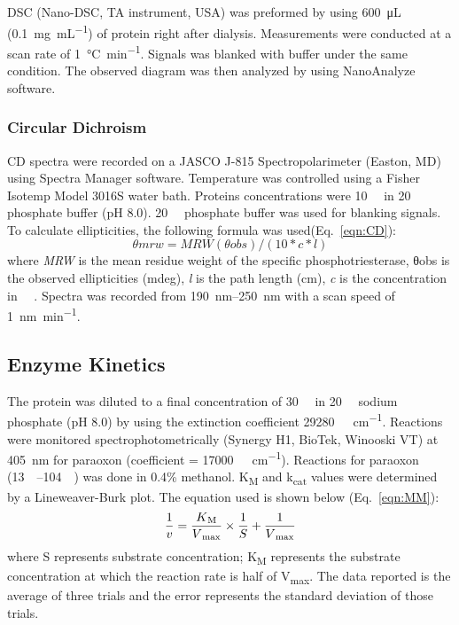\begin{refsection}
DSC (Nano-DSC, TA instrument, USA) was preformed by using \SI{600}{\micro\L}
(\SI{0.1}{\mg\per\mL}) of protein right after dialysis. Measurements were
conducted at a scan rate of \SI{1}{\celsius\per\minute}. Signals was blanked with
buffer under the same condition.  The observed diagram was then analyzed by
using NanoAnalyze software.

\subsubsection{Circular Dichroism}
\label{sec:cd}

CD spectra were recorded on a JASCO J-815 Spectropolarimeter (Easton, MD) using
Spectra Manager software. Temperature was controlled using a Fisher Isotemp
Model 3016S water bath. Proteins concentrations were \SI{10}{\micro\Molar} in
\SI{20}{\milli\Molar} phosphate buffer (pH 8.0). \SI{20}{\milli\Molar}
phosphate buffer was used for blanking signals. To calculate ellipticities, the
following formula was used(Eq.~\ref{eqn:CD}): 
\begin{equation}
    θmrw = MRW(θobs) / (10 * c * l) \label{eqn:CD}
\end{equation}
where \emph{MRW} is the mean residue weight of the specific phosphotriesterase,
θobs is the observed ellipticities (mdeg), \emph{l} is the path length (cm),
\emph{c} is the concentration in \SI{}{\micro\Molar}. Spectra was recorded from
\SIrange{190}{250}{\nm} with a scan speed of \SI{1}{\nano\meter\per\minute}.

\subsection{Enzyme Kinetics}
\label{sec:kinetics}

The protein was diluted to a final concentration of \SI{30}{\nano\Molar} in
\SI{20}{\milli\Molar} sodium phosphate (pH 8.0) by using the extinction
coefficient \SI{29280}{\per\Molar\per\cm}. Reactions were monitored
spectrophotometrically (Synergy H1, BioTek, Winooski VT) at \SI{405}{\nm} for
paraoxon (coefficient = \SI{17000}{\per\Molar\per\cm}).  Reactions for paraoxon
(\SIrange{13}{104}{\micro\Molar}) was done in 0.4\% methanol. K\textsubscript{M} and k\textsubscript{cat}
values were determined by a Lineweaver-Burk plot.\cite{Baker2011b} The
equation used is shown below (Eq.~\ref{eqn:MM}):
\begin{equation} 
    \frac{1}{v} =
    \frac{K\textsubscript{M}}{V\textsubscript{max}}\times\frac{1}{S} +
    \frac{1}{V\textsubscript{max}} \label{eqn:MM}
\end{equation}
where S represents substrate concentration; K\textsubscript{M} represents the substrate
concentration at which the reaction rate is half of V\textsubscript{max}. The
data reported is the average of three trials and the error represents the
standard deviation of those trials.


\end{refsection}
